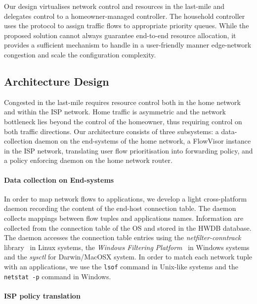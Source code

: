 Our design virtualises network control and resources in the last-mile and
delegates control to a homeowner-managed \of controller.  The household
controller uses the \of protocol to assign traffic flows to appropriate priority
queues.  While the proposed solution cannot always guarantee end-to-end resource
allocation, it provides a sufficient mechanism to handle in a user-friendly
manner edge-network congestion and scale the configuration complexity. 

\subsection{Architecture Design} \label{s:qos:architecture}

Congested in the last-mile requires resource control both in the home network
and within the ISP network. Home traffic is asymmetric and  the network
bottleneck lies beyond the control of the homeowner, thus requiring control on
both traffic directions.  Our architecture consists of three subsystems: a
data-collection daemon on the end-systems of the home network, a FlowVisor
instance in the ISP network, translating user flow prioritisation into
forwarding policy, and a policy enforcing daemon on the home network router. 

\paragraph*{Data collection on End-systems}

In order to map network flows to applications, we develop a light cross-platform
daemon recording the content of the end-host connection table.  The daemon
collects mappings between flow tuples and applications names.  Information are
collected from the connection table of the OS and stored in the HWDB database.
The daemon accesses the connection table entries using the
\textit{netfilter-conntrack} library~ in Linux systems, the
\textit{Windows Filtering Platform}~ in Windows systems and the
\textit{sysctl} for Darwin/MacOSX system.  In order to match each network tuple
with an applications, we use the \texttt{lsof} command in Unix-like systems and
the \texttt{netstat -p} command in Windows.


\paragraph*{ISP policy translation}


